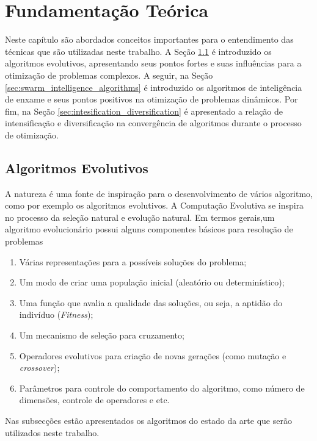 \chapter{Fundamentação Teórica}
\label{ch:fundamentos}

Neste capítulo são abordados conceitos importantes para o entendimento das técnicas que são utilizadas neste trabalho. A Seção \ref{sec:evolutionary_algorithms} é introduzido os algoritmos evolutivos, apresentando seus pontos fortes e suas influências para a otimização de problemas complexos. A seguir, na Seção \ref{sec:swarm_intelligence_algorithms} é introduzido os algoritmos de inteligência de enxame e seus pontos positivos na otimização de problemas dinâmicos. Por fim, na Seção \ref{sec:intesification_diversification} é apresentado a relação de intensificação e diversificação na convergência de algoritmos durante o processo de otimização.

\section{Algoritmos Evolutivos}
\label{sec:evolutionary_algorithms}
A natureza é uma fonte de inspiração para o desenvolvimento de vários algoritmo, como por exemplo os algoritmos evolutivos. A Computação Evolutiva se inspira no processo da seleção natural e evolução natural. 
Em termos gerais,um algoritmo evolucionário possui alguns componentes básicos para resolução de problemas \cite{parpinelli2011new}

\begin{enumerate}
\item Várias representações para a possíveis soluções do problema;
\item Um modo de criar uma população inicial (aleatório ou determinístico);
\item Uma função que avalia a qualidade das soluções, ou seja, a aptidão do indivíduo (\textit{Fitness});
\item Um mecanismo de seleção para cruzamento;
\item Operadores evolutivos para criação de novas gerações (como mutação e \textit{crossover});
\item Parâmetros para controle do comportamento do algoritmo, como número de dimensões, controle de operadores e etc.  
\end{enumerate}

Nas subsecções estão apresentados os algoritmos do estado da arte que serão utilizados neste trabalho.


